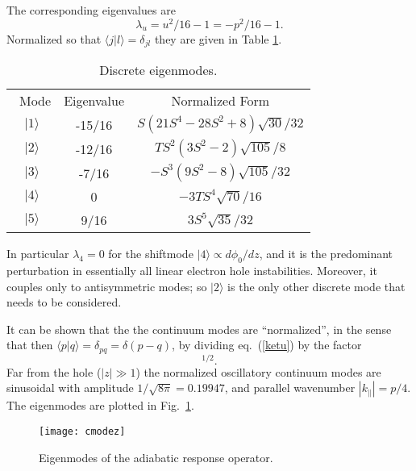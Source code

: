 \documentclass{jpp}
\def\ket#1{|#1\rangle}
\def\bra#1{\langle#1}
\begin{document}
The corresponding eigenvalues are
\begin{equation}
  \label{eigenvalues}
  \lambda_u= u^2/16-1=-p^2/16-1.
\end{equation}
Normalized so that
$\bra{j}\ket{l}=\delta_{jl}$ they are given in Table \ref{discrete}. 
\begin{table}
  \center
\begin{tabular}{ccc}\
  Mode & Eigenvalue & Normalized Form\\
  $\ket{1}$& -15/16&$S(21S^4 - 28S^2 + 8)\sqrt{30}/32$\\
  $\ket{2}$& -12/16&$TS^2(3S^2 - 2)\sqrt{105}/8$\\
  $\ket{3}$& -7/16 &$-S^3(9S^2 - 8)\sqrt{105}/32 $\\
  $\ket{4}$&  0 &$-3TS^4\sqrt{70}/16 $\\
  $\ket{5}$&  9/16 &$3S^5\sqrt{35}/32 $\\
\end{tabular}
\caption{Discrete eigenmodes.\label{discrete}}
\end{table}
\noindent
In particular $\lambda_4=0$ for the shiftmode
$\ket{4}\propto d\phi_0/dz$, and it is the predominant perturbation in
essentially all linear electron hole instabilities. Moreover, it
couples only to antisymmetric modes; so $\ket{2}$ is the only other
discrete mode that needs to be considered.

It can
be shown that the the continuum modes are ``normalized'', in the sense
that then $\bra{p}\ket{q}=\delta_{pq}=\delta(p-q)$, by dividing eq.\
(\ref{ketu}) by the factor
\begin{equation}
  [8\pi(p^2+1^2)(p^2+2^2)(p^2+3^2)(p^2+4^2)(p^2+5^2)]^{1/2}.
  \label{normfactor}
\end{equation}
Far
from the hole ($|z|\gg1$) the normalized oscillatory continuum modes are
sinusoidal with amplitude $1/\sqrt{8\pi}=0.19947$, and parallel wavenumber
$|k_\parallel|=p/4$. The eigenmodes are plotted in Fig.\
\ref{modeplots}.
\begin{figure}\center
  \texttt{[image: cmodez]}
  \caption{Eigenmodes of the adiabatic response operator.\label{modeplots}}
\end{figure}
\end{document}
